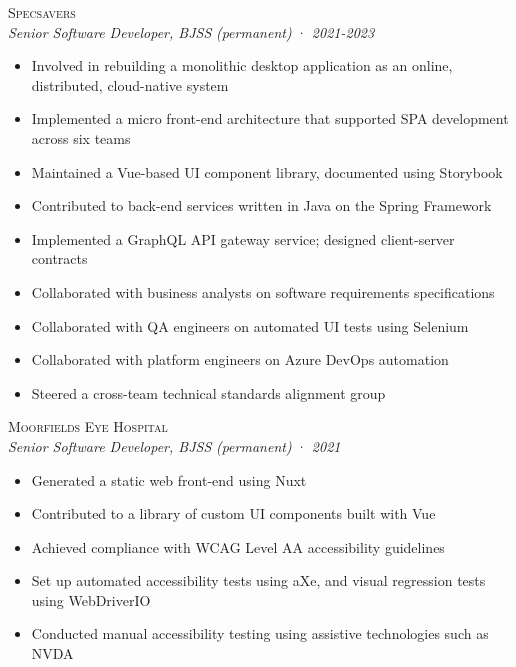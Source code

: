 \documentclass[a4paper,10pt]{article}
\newcommand{\resumeSubheading}[5][12pt]{
  \vspace{#1}
  {\scshape{#2}} \\
  \textit{\small{#3}} \textit{\small{(#4)}} · \textit{\small{#5}}
  \vspace{2pt}
}
\newcommand{\resumeListStart}{\begin{itemize}}
\newcommand{\resumeListEnd}{\end{itemize}}
\newcommand{\resumeItem}[1]{
  \item[\-·]\small{{#1\vspace{1pt}}}
}
\begin{document}

  \begin{minipage}{\textwidth}
    \resumeSubheading
      {Specsavers}
      {Senior Software Developer, BJSS}
      {permanent}
      {2021-2023}
    \resumeListStart
      \resumeItem{Involved in rebuilding a monolithic desktop application as an online, distributed, cloud-native system}
      \resumeItem{Implemented a micro front-end architecture that supported SPA development across six teams}
      \resumeItem{Maintained a Vue-based UI component library, documented using Storybook}
      \resumeItem{Contributed to back-end services written in Java on the Spring Framework}
      \resumeItem{Implemented a GraphQL API gateway service; designed client-server contracts}
      \resumeItem{Collaborated with business analysts on software requirements specifications}
      \resumeItem{Collaborated with QA engineers on automated UI tests using Selenium}
      \resumeItem{Collaborated with platform engineers on Azure DevOps automation}
      \resumeItem{Steered a cross-team technical standards alignment group}
    \resumeListEnd
  \end{minipage}


  \begin{minipage}{\textwidth}
    \resumeSubheading
      {Moorfields Eye Hospital}
      {Senior Software Developer, BJSS}
      {permanent}
      {2021}
    \resumeListStart
      \resumeItem{Generated a static web front-end using Nuxt}
      \resumeItem{Contributed to a library of custom UI components built with Vue}
      \resumeItem{Achieved compliance with WCAG Level AA accessibility guidelines}
      \resumeItem{Set up automated accessibility tests using aXe, and visual regression tests using WebDriverIO}
      \resumeItem{Conducted manual accessibility testing using assistive technologies such as NVDA}
    \resumeListEnd
  \end{minipage}
\end{document}
